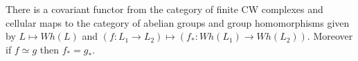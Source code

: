 There is a covariant functor from the category of finite CW complexes and cellular maps to the category of abelian groups and group homomorphisms given by $L \mapsto Wh(L)$ and $(f: L_1 \rightarrow L_2) \mapsto (f_*: Wh(L_1) \rightarrow Wh(L_2))$. Moreover if $f \simeq g$ then $f_* = g_*$.
